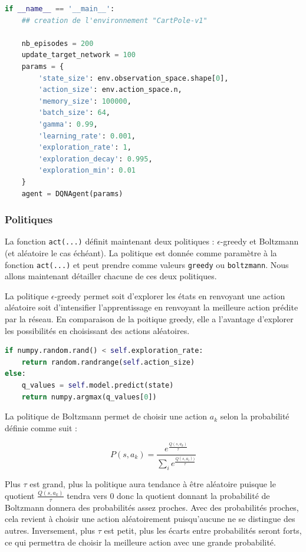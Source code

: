 \documentclass[10pt,a4paper]{article}
\begin{document}
\begin{lstlisting}[language=Python, caption=Paramétrage de l'agent DQN]
if __name__ == '__main__':
    ## creation de l'environnement "CartPole-v1"
    
    nb_episodes = 200
    update_target_network = 100
    params = {
        'state_size': env.observation_space.shape[0],
        'action_size': env.action_space.n,
        'memory_size': 100000,
        'batch_size': 64,
        'gamma': 0.99,
        'learning_rate': 0.001,
        'exploration_rate': 1,
        'exploration_decay': 0.995,
        'exploration_min': 0.01
    }
    agent = DQNAgent(params)
\end{lstlisting}

\subsubsection{Politiques} \label{politiquesDQN}

La fonction \lstinline{act(...)} définit maintenant deux politiques : $\epsilon$-greedy et Boltzmann (et aléatoire le cas échéant). La politique est donnée comme paramètre à la fonction \lstinline{act(...)} et peut prendre comme valeurs \lstinline{greedy} ou \lstinline{boltzmann}. Nous allons maintenant détailler chacune de ces deux politiques.

La politique $\epsilon$-greedy permet soit d'explorer les états en renvoyant une action aléatoire soit d'intensifier l'apprentissage en renvoyant la meilleure action prédite par la réseau. En comparaison de la poitique greedy, elle a l'avantage d'explorer les possibilités en choisissant des actions aléatoires.
\begin{lstlisting}[language=Python, caption=Politique e-greedy]
if numpy.random.rand() < self.exploration_rate:
    return random.randrange(self.action_size)
else:
    q_values = self.model.predict(state)
    return numpy.argmax(q_values[0])
\end{lstlisting}    

La politique de Boltzmann permet de choisir une action $a_k$ selon la probabilité définie comme suit :

 $$P(s, a_k) = \frac{e^{\frac{Q(s,a_k)}{\tau}}}{\sum_ie^{\frac{Q(s,a_i))}{\tau}}}$$
 
Plus $\tau$ est grand, plus la politique aura tendance à être aléatoire puisque le quotient $\frac{Q(s,a_k)}{\tau}$ tendra vers 0 donc la quotient donnant la probabilité de Boltzmann donnera des probabilités assez proches. Avec des probabilités proches, cela revient à choisir une action aléatoirement puisqu'aucune ne se distingue des autres. Inversement, plus $\tau$ est petit, plus les écarts entre probabilités seront forts, ce qui permettra de choisir la meilleure action avec une grande probabilité.
\end{document}

